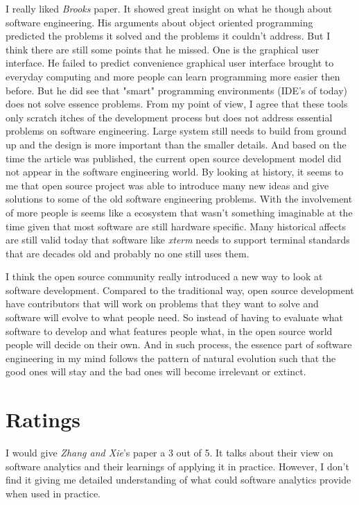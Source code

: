 \documentclass[sigconf]{acmart}
\begin{document}
I really liked {\it Brooks} paper. It showed great insight on what he though about software engineering. His arguments about object oriented programming predicted the problems it solved and the problems it couldn't address. But I think there are still some points that he missed. One is the graphical user interface. He failed to predict convenience graphical user interface brought to everyday computing and more people can learn programming more easier then before. But he did see that "smart" programming environments (IDE's of today) does not solve essence problems. From my point of view, I agree that these tools only scratch itches of the development process but does not address essential problems on software engineering. Large system still needs to build from ground up and the design is more important than the smaller details. And based on the time the article was published, the current open source development model did not appear in the software engineering world. By looking at history, it seems to me that open source project was able to introduce many new ideas and give solutions to some of the old software engineering problems. With the involvement of more people is seems like a ecosystem that wasn't something imaginable at the time given that most software are still hardware specific. Many historical affects are still valid today that software like {\it xterm} needs to support terminal standards that are decades old and probably no one still uses them.

I think the open source community really introduced a new way to look at software development. Compared to the traditional way, open source development have contributors that will work on problems that they want to solve and software will evolve to what people need. So instead of having to evaluate what software to develop and what features people what, in the open source world people will decide on their own. And in such process, the essence part of software engineering in my mind follows the pattern of natural evolution such that the good ones will stay and the bad ones will become irrelevant or extinct. 

\section{Ratings}
I would give {\it Zhang and Xie}'s paper a 3 out of 5. It talks about their view on software analytics and their learnings of applying it in practice. However, I don't find it giving me detailed understanding of what could software analytics provide when used in practice.
\end{document}
